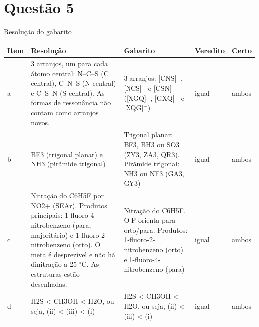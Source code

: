 \documentclass{article}%
\begin{document}
\section*{Questão 5}%
\href{https://poliedroresolve.sistemapoliedro.com.br/vestibulares/ita/2026/ita-2-fase-dia-2-29-10-2025-2-fase-dia-2/dissertativa-5-quimica-2-fase-dia-2-ita-2026}{Resolução do gabarito}\par\smallskip%
\begin{longtable}{@{}p{} p{} p{} p{} p{}@{}}\toprule Item & Resolução & Gabarito & Veredito & Certo \\ \midrule
a & 3 arranjos, um para cada átomo central: N--C--S (C central), C--N--S (N central) e C--S--N (S central). As formas de ressonância não contam como arranjos novos. & 3 arranjos: {[}CNS{]}$^{-}$, {[}NCS{]}$^{-}$ e {[}CSN{]}$^{-}$ ({[}XGQ{]}$^{-}$, {[}GXQ{]}$^{-}$ e {[}XQG{]}$^{-}$) & igual & ambos \\
b & BF3 (trigonal planar) e NH3 (pirâmide trigonal) & Trigonal planar: BF3, BH3 ou SO3 (ZY3, ZA3, QR3). Pirâmide trigonal: NH3 ou NF3 (GA3, GY3) & igual & ambos \\
c & Nitração do C6H5F por NO2+ (SEAr). Produtos principais: 1{-}fluoro{-}4{-}nitrobenzeno (para, majoritário) e 1{-}fluoro{-}2{-}nitrobenzeno (orto). O meta é desprezível e não há dinitração a 25 $^\circ$C. As estruturas estão desenhadas. & Nitração do C6H5F. O F orienta para orto/para. Produtos: 1{-}fluoro{-}2{-}nitrobenzeno (orto) e 1{-}fluoro{-}4{-}nitrobenzeno (para) & igual & ambos \\
d & H2S < CH3OH < H2O, ou seja, (ii) < (iii) < (i) & H2S < CH3OH < H2O, ou seja, (ii) < (iii) < (i) & igual & ambos \\
\bottomrule\end{longtable}%
\end{document}
